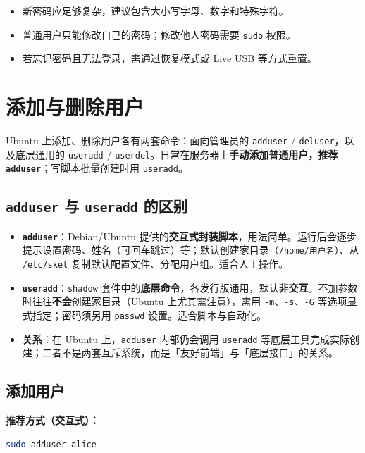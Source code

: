 \begin{itemize}
    \item 新密码应足够复杂，建议包含大小写字母、数字和特殊字符。
    \item 普通用户只能修改自己的密码；修改他人密码需要 \texttt{sudo} 权限。
    \item 若忘记密码且无法登录，需通过恢复模式或 Live USB 等方式重置。
\end{itemize}

\section{添加与删除用户}

Ubuntu 上添加、删除用户各有两套命令：面向管理员的 \texttt{adduser} / \texttt{deluser}，以及底层通用的 \texttt{useradd} / \texttt{userdel}。日常在服务器上\textbf{手动添加普通用户，推荐 \texttt{adduser}}；写脚本批量创建时用 \texttt{useradd}。

\subsection{\texttt{adduser} 与 \texttt{useradd} 的区别}

\begin{itemize}
    \item \textbf{\texttt{adduser}}：Debian/Ubuntu 提供的\textbf{交互式封装脚本}，用法简单。运行后会逐步提示设置密码、姓名（可回车跳过）等；默认创建家目录（\texttt{/home/用户名}）、从 \texttt{/etc/skel} 复制默认配置文件、分配用户组。适合人工操作。
    \item \textbf{\texttt{useradd}}：\texttt{shadow} 套件中的\textbf{底层命令}，各发行版通用，默认\textbf{非交互}。不加参数时往往\textbf{不会}创建家目录（Ubuntu 上尤其需注意），需用 \texttt{-m}、\texttt{-s}、\texttt{-G} 等选项显式指定；密码须另用 \texttt{passwd} 设置。适合脚本与自动化。
    \item \textbf{关系}：在 Ubuntu 上，\texttt{adduser} 内部仍会调用 \texttt{useradd} 等底层工具完成实际创建；二者不是两套互斥系统，而是「友好前端」与「底层接口」的关系。
\end{itemize}

\subsection{添加用户}

\textbf{推荐方式（交互式）：}

\begin{lstlisting}[language=sh]
sudo adduser alice
\end{lstlisting}

